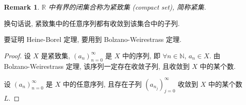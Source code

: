 \documentclass[UTF8]{ctexart}
\theoremstyle{mystyle}
\theoremstyle{myremark}
\newtheorem*{remark}{Remark}
\theoremstyle{plain}
\newcommand{\R}{\mathbb R}
\newcommand{\N}{\mathbb N}
\begin{document}
\begin{remark}
    $ \R $ 中有界的闭集合称为紧致集 (compact set), 简称紧集.
\end{remark}

换句话说, 紧致集中的任意序列都有收敛到该集合中的子列.

要证明 Heine-Borel 定理, 要用到 Bolzano-Weirestrass 定理.

\begin{proof}
    设 $ X $ 是紧致集, $ (a_n)_{n = 0}^\infty $ 是 $ X $ 中的序列, 即 $ \forall n \in \N $, $ a_n \in X $. 由 Bolzano-Weirestrass 定理, 该序列一定存在收敛子列, 且收敛到 $ X $ 中的某个数.

    设 $ (a_n)_{n = 0}^\infty $ 是 $ X $ 中的任意序列, 且存在子列 $ (a_{n_j})_{j = 0}^\infty $ 收敛到 $ X $ 中的某个数 $ L $.
\end{proof}
\end{document}
